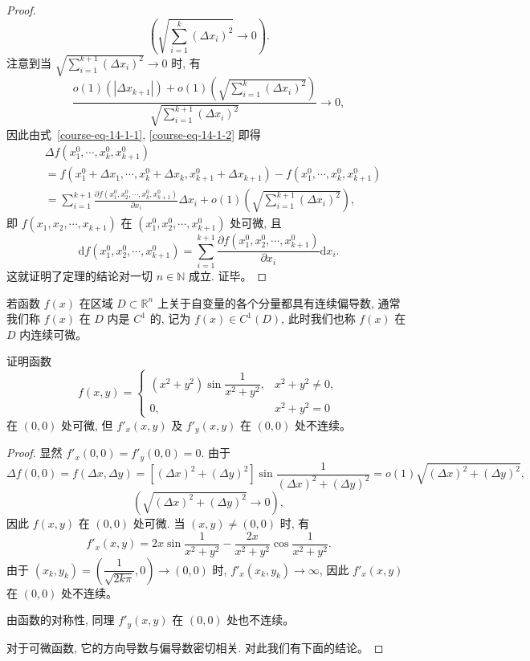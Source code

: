 \documentclass[UTF8,12pt,a4paper,fontset=fandol]{ctexart}
\begin{document}
\begin{proof}
\[
  \left(\sqrt{\sum_{i=1}^k(\Delta x_i)^2}\to0\right).
\]
注意到当 $\sqrt{\sum\limits_{i=1}^{k+1}(\Delta x_i)^2}\to0$ 时, 有
\[
  \frac{
  o(1)(|\Delta x_{k+1}|)
  +o(1)\left(\sqrt{\sum\limits_{i=1}^k(\Delta x_i)^2}\right)}
  {\sqrt{\sum\limits_{i=1}^{k+1}(\Delta x_i)^2}}\to0,
\]
因此由式~\eqref{course-eq-14-1-1}, \eqref{course-eq-14-1-2}  即得
\[
\begin{aligned}
&\Delta f(x_1^0,\cdots,x_k^0,x_{k+1}^0)\\
&=
  f(x_1^0+\Delta x_1,\cdots,x_k^0+\Delta x_k,x_{k+1}^0+\Delta x_{k+1})
  -f(x_1^0,\cdots,x_k^0,x_{k+1}^0)\\
&=\sum_{i=1}^{k+1}
  \frac{\partial f(x_1^0,x_2^0,\cdots,x_k^0,x_{k+1}^0)}{\partial x_i}\Delta x_i
  +o(1)\left(\sqrt{\sum_{i=1}^{k+1}(\Delta x_i)^2}\right),
\end{aligned}
\]
即 $f(x_1,x_2,\cdots,x_{k+1})$ 在 $(x_1^0,x_2^0,\cdots,x_{k+1}^0)$ 处可微, 且
\[
  \mathrm df(x_1^0,x_2^0,\cdots,x_{k+1}^0)
  =\sum_{i=1}^{k+1}
  \frac{\partial f(x_1^0,x_2^0,\cdots,x_{k+1}^0)}{\partial x_i}\mathrm dx_i.
\]
这就证明了定理的结论对一切 $n\in\mathbb N$ 成立. 证毕。

\end{proof}
\begin{remark}\quad 若函数 $f(x)$ 在区域 $D\subset\mathbb R^n$ 上关于自变量的各个分量都具有连续偏导数, 通常我们称 $f(x)$ 在 $D$ 内是 $C^1$ 的, 记为 $f(x)\in C^1(D)$, 此时我们也称 $f(x)$ 在 $D$ 内连续可微。

\end{remark}
\begin{example}\label{course-example-14-1-5}\quad 证明函数
\[
  f(x,y)=
  \begin{cases}
    (x^2+y^2)\sin\dfrac1{x^2+y^2}, & x^2+y^2\ne0,\\
    0, & x^2+y^2=0
  \end{cases}
\]
在 $(0,0)$ 处可微, 但 $f'_x(x,y)$ 及 $f'_y(x,y)$ 在 $(0,0)$ 处不连续。

\end{example}
\begin{proof}\quad 显然 $f'_x(0,0)=f'_y(0,0)=0$. 由于
\[
  \Delta f(0,0)=f(\Delta x,\Delta y)
  =[(\Delta x)^2+(\Delta y)^2]\sin\frac1{(\Delta x)^2+(\Delta y)^2}
  =o(1)\sqrt{(\Delta x)^2+(\Delta y)^2},
\]
\[
  \left(\sqrt{(\Delta x)^2+(\Delta y)^2}\to0\right),
\]
因此 $f(x,y)$ 在 $(0,0)$ 处可微. 当 $(x,y)\ne(0,0)$ 时, 有
\[
  f'_x(x,y)=2x\sin\frac1{x^2+y^2}-\frac{2x}{x^2+y^2}\cos\frac1{x^2+y^2}.
\]
由于 $(x_k,y_k)=\left(\dfrac1{\sqrt{2k\pi}},0\right)\to(0,0)$ 时, $f'_x(x_k,y_k)\to\infty$, 因此 $f'_x(x,y)$ 在 $(0,0)$ 处不连续。

由函数的对称性, 同理 $f'_y(x,y)$ 在 $(0,0)$ 处也不连续。

对于可微函数, 它的方向导数与偏导数密切相关. 对此我们有下面的结论。

\end{proof}
\end{document}
